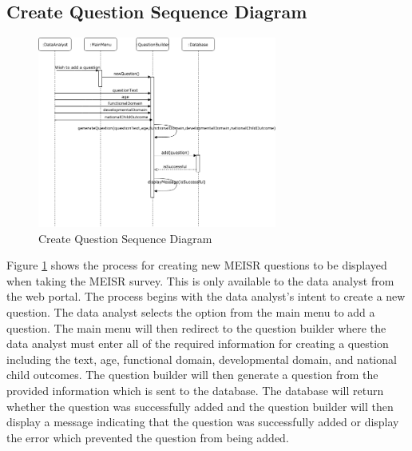 \subsection{Create Question Sequence Diagram}
\begin{figure}[H]
  \centering
  \includegraphics[width=0.7\textwidth]{images/CreateQuestionSequenceDiagram.png}
  \caption{Create Question Sequence Diagram}
  \label{fig:createQuestionSD}
\end{figure}

	Figure \ref{fig:createQuestionSD} shows the process for creating new MEISR questions to be displayed when taking the MEISR survey. This is only available to the data analyst from the web portal. The process begins with the data analyst's intent to create a new question. The data analyst selects the option from the main menu to add a question. The main menu will then redirect to the question builder where the data analyst must enter all of the required information for creating a question including the text, age, functional domain, developmental domain, and national child outcomes. The question builder will then generate a question from the provided information which is sent to the database. The database will return whether the question was successfully added and the question builder will then display a message indicating that the question was successfully added or display the error which prevented the question from being added.

